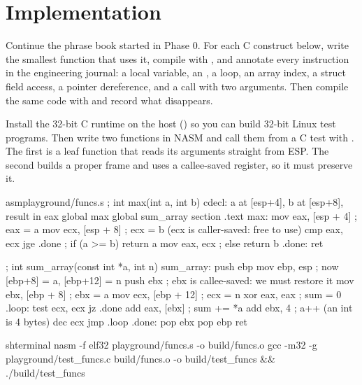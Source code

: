 \documentclass[11pt,a4paper]{article}
\begin{document}
\section{Implementation}

Continue the phrase book started in Phase 0. For each C construct below, write the smallest function that uses
it, compile with , and annotate every instruction in the engineering journal: a
local variable, an , a  loop, an array index, a struct field access, a pointer dereference, and a
call with two arguments. Then compile the same code with  and record what disappears.

Install the 32-bit C runtime on the host () so you can build
32-bit Linux test programs. Then write two functions in NASM and call them from a C test with . The
first is a leaf function that reads its arguments straight from ESP. The second builds a proper frame and uses a
callee-saved register, so it must preserve it.

\begin{lst}{asm}{playground/funcs.s}
; int max(int a, int b)      cdecl: a at [esp+4], b at [esp+8], result in eax
global max
global sum_array
section .text
max:
    mov  eax, [esp + 4]     ; eax = a
    mov  ecx, [esp + 8]     ; ecx = b   (ecx is caller-saved: free to use)
    cmp  eax, ecx
    jge  .done              ; if (a >= b) return a
    mov  eax, ecx           ; else return b
.done:
    ret

; int sum_array(const int *a, int n)
sum_array:
    push ebp
    mov  ebp, esp           ; now [ebp+8] = a, [ebp+12] = n
    push ebx                ; ebx is callee-saved: we must restore it
    mov  ebx, [ebp + 8]     ; ebx = a
    mov  ecx, [ebp + 12]    ; ecx = n
    xor  eax, eax           ; sum = 0
.loop:
    test ecx, ecx
    jz   .done
    add  eax, [ebx]         ; sum += *a
    add  ebx, 4             ; a++   (an int is 4 bytes)
    dec  ecx
    jmp  .loop
.done:
    pop  ebx
    pop  ebp
    ret
\end{lst}

\begin{lst}{sh}{terminal}
nasm -f elf32 playground/funcs.s -o build/funcs.o
gcc -m32 -g playground/test_funcs.c build/funcs.o -o build/test_funcs && ./build/test_funcs
\end{lst}
\end{document}
